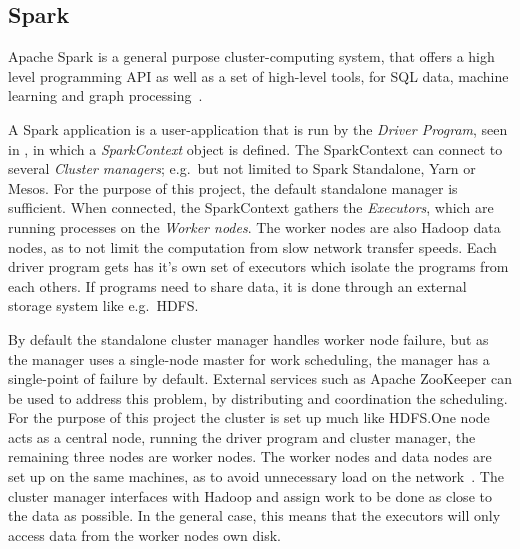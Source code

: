 \subsection{Spark}\label{sec:spark}
Apache Spark is a general purpose cluster-computing system, that offers a high level programming API as well as a set of high-level tools, for SQL data, machine learning and graph processing~\cite{sparkintro}.

A Spark application is a user-application that is run by the \emph{Driver Program}, seen in , in which a \emph{SparkContext} object is defined. The SparkContext can connect to several \emph{Cluster managers}; e.g.\ but not limited to Spark Standalone, Yarn or Mesos. For the purpose of this project, the default standalone manager is sufficient. When connected, the SparkContext gathers the \emph{Executors}, which are running processes on the \emph{Worker nodes}. The worker nodes are also Hadoop data nodes, as to not limit the computation from slow network transfer speeds. Each driver program gets has it's own set of executors which isolate the programs from each others. If programs need to share data, it is done through an external storage system like e.g.\ HDFS.\@

By default the standalone cluster manager handles worker node failure, but as the manager uses a single-node master for work scheduling, the manager has a single-point of failure by default. External services such as Apache ZooKeeper can be used to address this problem, by distributing and coordination the scheduling. For the purpose of this project the cluster is set up much like HDFS.\@ One node acts as a central node, running the driver program and cluster manager, the remaining three nodes are worker nodes. The worker nodes and data nodes are set up on the same machines, as to avoid unnecessary load on the network~\cite{sparkcluster}. The cluster manager interfaces with Hadoop and assign work to be done as close to the data as possible. In the general case, this means that the executors will only access data from the worker nodes own disk. %

